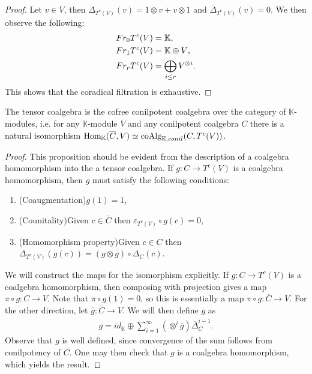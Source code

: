 \documentclass[../thesis.tex]{subfiles}
\begin{document}
            \begin{proof}
                Let $v\in V$, then $\Delta_{T^c(V)}(v)=1\otimes v + v\otimes 1$ and $\overline{\Delta}_{T^c(V)}(v)=0$. We then observe the following:
                \begin{align*}
                    Fr_0T^c(V) & = \mathbb{K}\tt{,} \\
                    Fr_1T^c(V) & = \mathbb{K} \oplus V\tt{,} \\
                    Fr_rT^c(V) & = \bigoplus_{i\leq r} V^{\otimes i}\tt{.}
                \end{align*}
                This shows that the coradical filtration is exhaustive.
            \end{proof}

            \begin{proposition}\label{prop: cofree-tensor}
                The tensor coalgebra is the cofree conilpotent coalgebra over the category of $\mathbb{K}$-modules, i.e. for any $\mathbb{K}$-module $V$ and any conilpotent coalgebra $C$ there is a natural isomorphism $\tt{Hom}_{\mathbb{K}}(\overline{C}, V)\simeq \tt{coAlg}_{\mathbb{K}, conil}(C, T^c(V))$.
            \end{proposition}

            \begin{proof}
                This proposition should be evident from the description of a coalgebra homomorphism into the a tensor coalgebra. If $g:C\rightarrow T^c(V)$ is a coalgebra homomorphism, then $g$ must satisfy the following conditions:
                \begin{enumerate}
                    \item (Coaugmentation)\quad $g(1)=1$,
                    \item (Counitality)\quad Given $c\in \overline{C}$ then $\varepsilon_{T^c(V)}\circ g(c)=0$,
                    \item (Homomorphism property)\quad Given $c\in C$ then $\Delta_{T^c(V)}(g(c))=(g\otimes g)\circ\Delta_C(c)$.
                \end{enumerate}

                We will construct the maps for the isomorphism explicitly. If $g:C\rightarrow T^c(V)$ is a coalgebra homomorphism, then composing with projection gives a map $\pi\circ g:C\rightarrow V$. Note that $\pi\circ g(1)=0$, so this is essentially a map $\pi\circ g:\overline{C}\rightarrow V$. For the other direction, let $\overline{g}:\overline{C}\rightarrow V$. We will then define $g$ as
                \begin{align*}
                    g = id_{\mathbb{K}} \oplus \sum_{i=1}^{\infty}(\otimes^{i}\overline{g})\overline{\Delta}_C^{i-1}.
                \end{align*}
                Observe that $g$ is well defined, since convergence of the sum follows from conilpotency of $C$. One may then check that $g$ is a coalgebra homomorphism, which yields the result.
            \end{proof}
\end{document}
